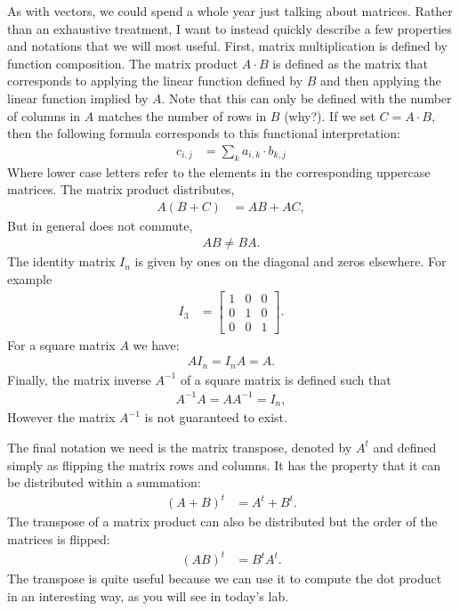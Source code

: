 \documentclass[12pt,hidelinks]{article}
\numberwithin{equation}{section}
\begin{document}
As with vectors, we could spend a whole year just talking about matrices.
Rather than an exhaustive treatment, I want to instead quickly describe a
few properties and notations that we will most useful. First, matrix multiplication
is defined by function composition. The matrix product $A \cdot B$ is defined
as the matrix that corresponds to applying the linear function defined by
$B$ and then applying the linear function implied by $A$. Note that this can
only be defined with the number of columns in $A$ matches the number of rows
in $B$ (why?). If we set $C = A \cdot B$, then the following formula corresponds
to this functional interpretation:
\begin{align}
c_{i, j} &= \sum_k a_{i, k} \cdot b_{k, j}
\end{align}
Where lower case letters refer to the elements in the corresponding uppercase
matrices. The matrix product distributes,
\begin{align}
A (B + C) &= AB + AC,
\end{align}
But in general does not commute,
\begin{align}
AB \neq BA.
\end{align}
The identity matrix $I_n$ is given by ones on the diagonal and zeros elsewhere.
For example
\begin{align}
I_3 &= \begin{bmatrix} 1 & 0 & 0 \\ 0 & 1 & 0 \\ 0 & 0 & 1 \end{bmatrix}.
\end{align}
For a square matrix $A$ we have:
\begin{align}
A I_n = I_n A = A.
\end{align}
Finally, the matrix inverse $A^{-1}$ of a square matrix is defined such that
\begin{align}
A^{-1} A = A A^{-1} = I_n,
\end{align}
However the matrix $A^{-1}$ is not guaranteed to exist.

The final notation we need is the matrix transpose, denoted by $A^t$ and
defined simply as flipping the matrix rows and columns. It has the property
that it can be distributed within a summation:
\begin{align}
(A + B)^t &= A^t + B^t.
\end{align}
The transpose of a matrix product can also be distributed but the order of
the matrices is flipped:
\begin{align}
(AB)^t &= B^t A^t.
\end{align}
The transpose is quite useful because we can use it to compute the dot product
in an interesting way, as you will see in today's lab.
\end{document}
